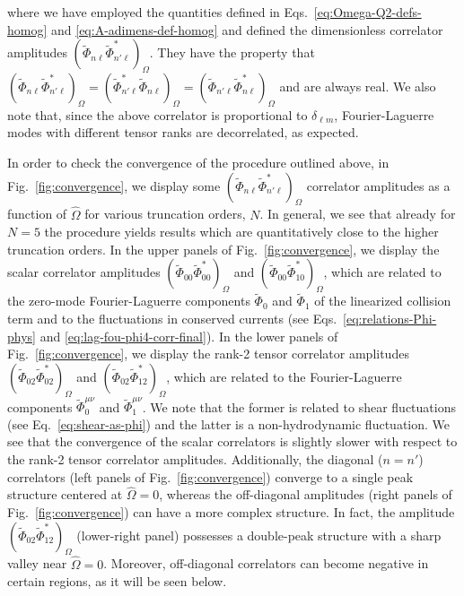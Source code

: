 \documentclass[aps,prd,preprint,nofootinbib,amsmath,amssymb,showpacs,longbibliography,singlecolumn,superscriptaddress,10pt]{revtex4-1}
\theoremstyle{plain}
\theoremstyle{definition}
\begin{document}
%
where we have employed the quantities defined in Eqs.~\eqref{eq:Omega-Q2-defs-homog} and \eqref{eq:A-adimens-def-homog} and defined the dimensionless correlator amplitudes $\left( \widetilde{\Phi}_{n \ell}
\widetilde{\Phi}_{n' \ell}^{*}
 \right)_{\Omega}$. They have the property that $\left( \widetilde{\Phi}_{n \ell}
\widetilde{\Phi}_{n' \ell}^{*}
 \right)_{\Omega} =  \left( \widetilde{\Phi}_{n' \ell}^{*}
\widetilde{\Phi}_{n \ell}
 \right)_{\Omega} =  \left( \widetilde{\Phi}_{n'\ell}
\widetilde{\Phi}_{n\ell}^{*}
 \right)_{\Omega}$ and are always real. We also note that, since the above correlator is proportional to $\delta_{\ell m}$, Fourier-Laguerre modes with different tensor ranks are decorrelated, as expected. 

 
In order to check the convergence of the procedure outlined above, in Fig.~\ref{fig:convergence}, we display some $\left( \widetilde{\Phi}_{n \ell} \widetilde{\Phi}^{*}_{n'\ell}  \right)_{\Omega}$ correlator amplitudes as a function of $\widehat{\Omega}$ for various truncation orders, $N$. In general, we see that already for $N = 5$ the procedure yields results which are quantitatively close to the higher truncation orders. In the upper panels of Fig.~\ref{fig:convergence}, we display the scalar correlator amplitudes $\left( \widetilde{\Phi}_{00}
\widetilde{\Phi}_{00}^{*}
 \right)_{\Omega}$ and $\left( \widetilde{\Phi}_{00}
\widetilde{\Phi}_{10}^{*}
 \right)_{\Omega}$, which are related to the zero-mode Fourier-Laguerre components $\widetilde{\Phi}_{0}$ and $\widetilde{\Phi}_{1}$ of the linearized collision term and to the fluctuations in conserved currents (see Eqs.~\eqref{eq:relations-Phi-phys} and \eqref{eq:lag-fou-phi4-corr-final}). In the lower panels of Fig.~\ref{fig:convergence}, we display the rank-2 tensor correlator amplitudes $\left( \widetilde{\Phi}_{02}
\widetilde{\Phi}_{02}^{*}
 \right)_{\Omega}$ and $\left( \widetilde{\Phi}_{02}
\widetilde{\Phi}_{12}^{*}
 \right)_{\Omega}$, which are related to the Fourier-Laguerre components $\widetilde{\Phi}_{0}^{\mu \nu}$ and $\widetilde{\Phi}_{1}^{\mu \nu}$. We note that the former is related to shear fluctuations (see Eq.~\eqref{eq:shear-as-phi}) and the latter is a non-hydrodynamic fluctuation.  We see that the convergence of the scalar correlators is slightly slower with respect to the rank-2 tensor correlator amplitudes. Additionally, the diagonal ($n = n'$) correlators (left panels of Fig.~\ref{fig:convergence}) converge to a single peak structure centered at $\widehat{\Omega} = 0$, whereas the off-diagonal amplitudes (right panels of Fig.~\ref{fig:convergence}) can have a more complex structure. In fact, the amplitude $\left( \widetilde{\Phi}_{02}
\widetilde{\Phi}_{12}^{*}
 \right)_{\Omega}$ (lower-right panel) possesses a double-peak structure with a sharp valley near $\widehat{\Omega} = 0$. Moreover, off-diagonal correlators can become negative in certain regions, as it will be seen below.
\end{document}

